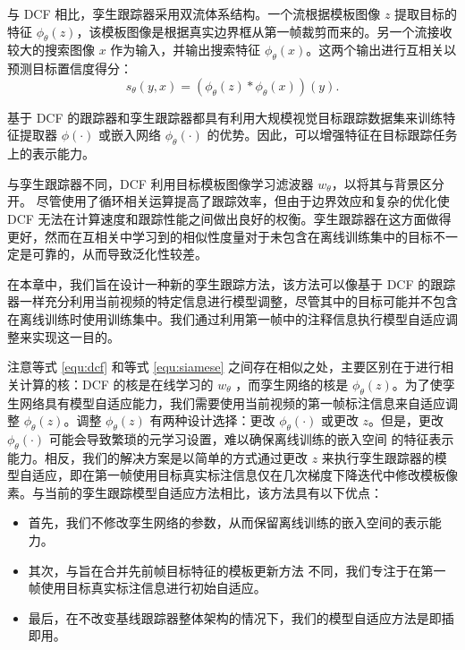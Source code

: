 与 DCF 相比，孪生跟踪器采用双流体系结构。一个流根据模板图像 $z$ 提取目标的特征 $\phi_\theta(z)$，该模板图像是根据真实边界框从第一帧裁剪而来的。另一个流接收较大的搜索图像 $x$ 作为输入，并输出搜索特征 $\phi_\theta(x)$。这两个输出进行互相关以预测目标置信度得分：
\begin{equation}
    s_\theta(y,x)=(\phi_\theta(z) * \phi_\theta(x))(y).
    \label{equ:siamese}
\end{equation}

基于 DCF 的跟踪器和孪生跟踪器都具有利用大规模视觉目标跟踪数据集来训练特征提取器 $\phi(\cdot)$ 或嵌入网络 $\phi_{\theta}(\cdot)$ 的优势。因此，可以增强特征在目标跟踪任务上的表示能力。

与孪生跟踪器不同，DCF 利用目标模板图像学习滤波器 $w_\theta$，以将其与背景区分开。
尽管使用了循环相关运算提高了跟踪效率，但由于边界效应和复杂的优化使 DCF 无法在计算速度和跟踪性能之间做出良好的权衡。孪生跟踪器在这方面做得更好，然而在互相关中学习到的相似性度量对于未包含在离线训练集中的目标不一定是可靠的，从而导致泛化性较差。

在本章中，我们旨在设计一种新的孪生跟踪方法，该方法可以像基于 DCF 的跟踪器一样充分利用当前视频的特定信息进行模型调整，尽管其中的目标可能并不包含在离线训练时使用训练集中。我们通过利用第一帧中的注释信息执行模型自适应调整来实现这一目的。

注意等式 \ref{equ:dcf} 和等式 \ref{equ:siamese} 之间存在相似之处，主要区别在于进行相关计算的核：DCF 的核是在线学习的 $w_{\theta}$ ，而孪生网络的核是 $\phi_\theta(z)$。为了使孪生网络具有模型自适应能力，我们需要使用当前视频的第一帧标注信息来自适应调整 $\phi_\theta(z)$。调整 $\phi_\theta(z)$ 有两种设计选择：更改 $\phi_\theta(\cdot)$ 或更改 $z$。但是，更改 $\phi_\theta(\cdot)$ 可能会导致繁琐的元学习设置，难以确保离线训练的嵌入空间 \cite{ROAM, DBLP:conf/aaai/JungYNCH20}的特征表示能力。相反，我们的解决方案是以简单的方式通过更改 $z$ 来执行孪生跟踪器的模型自适应，即在第一帧使用目标真实标注信息仅在几次梯度下降迭代中修改模板像素。与当前的孪生跟踪模型自适应方法相比，该方法具有以下优点：

\begin{itemize}
\item 首先，我们不修改孪生网络的参数，从而保留离线训练的嵌入空间的表示能力。
\item 其次，与旨在合并先前帧目标特征的模板更新方法 \cite{zhu2018distractor, Zhang_2019_ICCV} 不同，我们专注于在第一帧使用目标真实标注信息进行初始自适应。
\item 最后，在不改变基线跟踪器整体架构的情况下，我们的模型自适应方法是即插即用。
\end{itemize}

